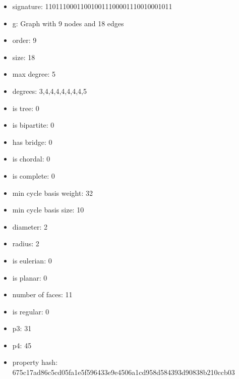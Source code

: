 \newpage
\begin{figure}
\end{figure}
\begin{itemize}
\item signature: 110111000110010011100001110010001011
\item g: Graph with 9 nodes and 18 edges
\item order: 9
\item size: 18
\item max degree: 5
\item degrees: 3,4,4,4,4,4,4,4,5
\item is tree: 0
\item is bipartite: 0
\item has bridge: 0
\item is chordal: 0
\item is complete: 0
\item min cycle basis weight: 32
\item min cycle basis size: 10
\item diameter: 2
\item radius: 2
\item is eulerian: 0
\item is planar: 0
\item number of faces: 11
\item is regular: 0
\item p3: 31
\item p4: 45
\item property hash: 675c17ad86c5cd05fa1e5f596433e9e4506a1cd958d584393d90838b210ccb03
\end{itemize}
